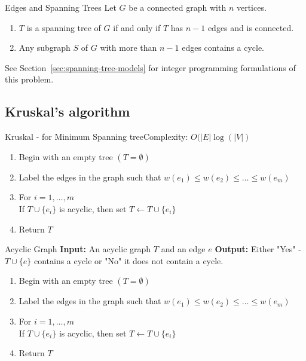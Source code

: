 \begin{lemma}{Edges and Spanning Trees}{}
Let  $G$ be a  connected graph with $n$ vertices.  
\begin{enumerate}
\item $T$ is a spanning tree of $G$ if and only if $T$ has $n-1$ edges and is connected.
\item Any subgraph $S$ of $G$ with more than $n-1$ edges contains a cycle.
\end{enumerate}
\end{lemma}

See Section~\ref{sec:spanning-tree-models} for integer programming formulations of this problem.  
\subsection{Kruskal's algorithm}
\begin{general}{Kruskal  - for Minimum Spanning tree}{Complexity: $O(|E| \log(|V|)$}
\label{alg:Kruskal}
\begin{enumerate}
\item Begin with an empty tree $(T = \emptyset)$
\item Label the edges in the graph such that $w(e_1) \leq w(e_2) \leq \dots \leq w(e_m)$
\item For $i=1, \dots, m$\\
\indent  If $T \cup\{e_i\}$ is acyclic, then set $T \leftarrow T \cup \{e_i\}$
\item Return $T$
\end{enumerate}
\end{general}

\begin{general}{Acyclic Graph}{}
\label{alg:Acyclic}
\textbf{Input:} An acyclic graph $T$ and an edge $e$
\textbf{Output:} Either "Yes" - $T \cup \{e\}$ contains a cycle or "No" it does not contain a cycle.
\begin{enumerate}
\item Begin with an empty tree $(T = \emptyset)$
\item Label the edges in the graph such that $w(e_1) \leq w(e_2) \leq \dots \leq w(e_m)$
\item For $i=1, \dots, m$\\
\indent  If $T \cup\{e_i\}$ is acyclic, then set $T \leftarrow T \cup \{e_i\}$
\item Return $T$
\end{enumerate}
\end{general}

